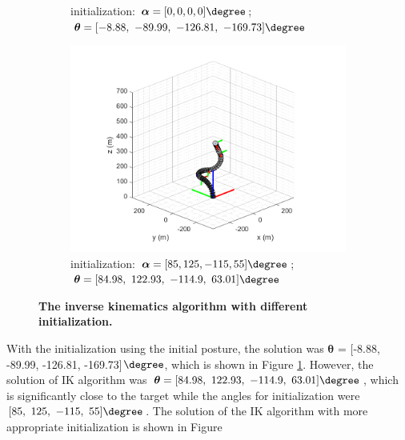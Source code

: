 \begin{figure}[H]
\begin{subfigure}{0.49\textwidth}
        \caption{\centering initialization: $\boldsymbol{\alpha} = [0, 0, 0, 0]\degree$; \\
        $\boldsymbol{\theta} = [-8.88,\ -89.99,\ -126.81,\ -169.73]\degree$ }
        \label{fig:complex_init_0_0_0_0}
    \end{subfigure}
    \begin{subfigure}{0.49\textwidth} %
        \centering
        \includegraphics[width=\linewidth]{Image/MATLAB/manipulator_84.98_122.93_-114.9_63.01.png}
        \caption{\centering initialization: $\boldsymbol{\alpha} = [85, 125, -115, 55]\degree$; \\
        $\boldsymbol{\theta} = [84.98,\ 122.93,\ -114.9,\ 63.01]\degree$ }
        \label{fig:complex_init_85_125_-115_55}
    \end{subfigure}
    \caption[The kinematics model of manipulator with respective bending modules]
    {\centering \textbf{The inverse kinematics algorithm with different initialization.}}
    \label{fig:80_120_-120_90_diff_initial}
\end{figure}
\vspace{-5mm}
\noindent With the initialization using the initial posture, the solution was $\boldsymbol{\theta}$ = 
[-8.88, -89.99, -126.81, -169.73]$\degree$, which is shown in Figure \ref{fig:complex_init_0_0_0_0}. 
However, the solution of IK algorithm was $\boldsymbol{\theta} = [84.98,\ 122.93,\ -114.9,\ 63.01]\degree$, 
which is significantly close to the target while the angles for initialization were $[85,\ 125,\ -115,\ 55]\degree$. 
The solution of the IK algorithm with more appropriate initialization is shown in Figure 
